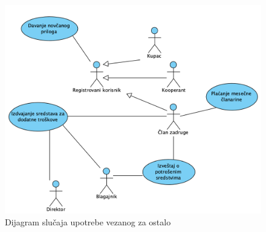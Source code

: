 \documentclass[a4paper]{article}
\begin{document}

\begin{figure}[h!]
    \centering
    \includegraphics[scale=0.64]{images/dslucup_ostalo.png}
    \caption{Dijagram slučaja upotrebe vezanog za ostalo}
    \label{dslucup_ostalo}
\end{figure}

\clearpage
\end{document}
